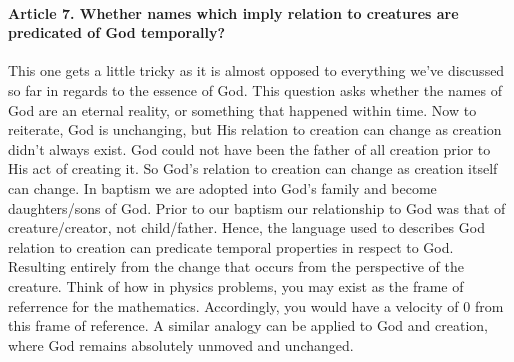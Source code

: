 \documentclass{ucetd}
\begin{document}
\paragraph{Article 7. Whether names which imply relation to creatures are predicated of God temporally?}
This one gets a little tricky as it is almost opposed to everything we've discussed so far in regards to the essence of God. This question asks whether the names of God are an eternal reality, or something that happened within time. Now to reiterate, God is unchanging, but His relation to creation can change as creation didn't always exist. God could not have been the father of all creation prior to His act of creating it. So God's relation to creation can change as creation itself can change. In baptism we are adopted into God's family and become daughters/sons of God. Prior to our baptism our relationship to God was that of creature/creator, not child/father. Hence, the language used to describes God relation to creation can predicate temporal properties in respect to God. Resulting entirely from the change that occurs from the perspective of the creature. Think of how in physics problems, you may exist as the frame of referrence for the mathematics. Accordingly, you would have a velocity of 0 from this frame of reference. A similar analogy can be applied to God and creation, where God remains absolutely unmoved and unchanged.
\end{document}
